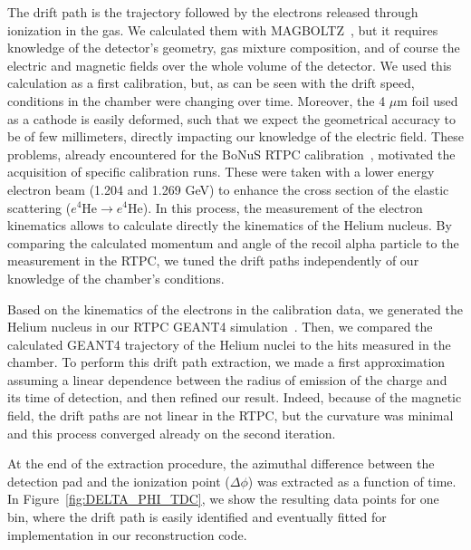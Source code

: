 \documentclass[preprint,5p]{elsarticle}
\begin{document}
The drift path is the trajectory followed by the electrons released through 
ionization in the gas. We calculated them with
MAGBOLTZ~\cite{Biagi:1999nwa}, but it requires knowledge of the detector's 
geometry, gas mixture composition, and of course the electric and magnetic 
fields over the whole volume of the detector. We used this calculation as a 
first calibration, but, 
as can be seen with the drift speed, conditions in the chamber were changing 
over time. Moreover, the 4 $\mu$m foil used as a cathode is easily deformed, such
that we expect the geometrical accuracy to be of few millimeters, directly impacting 
our knowledge of the electric field. These problems, already 
encountered for the BoNuS RTPC calibration~\cite{Fenker:2008zz}, motivated the 
acquisition of specific calibration runs. These were taken with a lower energy 
electron beam (1.204 and 1.269 GeV) to enhance the cross section of the elastic 
scattering ($e^{4}$He$\rightarrow e^{4}$He). In this process, the measurement of
the electron kinematics allows to calculate directly the kinematics of the Helium nucleus. 
By comparing the calculated momentum and angle of the recoil alpha particle to the 
measurement in the RTPC, we tuned the drift paths independently of our 
knowledge of the chamber's conditions.

Based on the kinematics of the electrons in the calibration data, 
we generated the Helium nucleus in our RTPC GEANT4 simulation~\cite{GEANT4}. Then,
we compared the calculated GEANT4 trajectory of the Helium nuclei to 
the hits measured in the chamber. To perform this drift path extraction, 
we made a first approximation assuming a linear dependence between the radius 
of emission of the charge and its time of detection, and then refined our 
result. Indeed, because of the magnetic field, the drift paths are not linear 
in the RTPC, but the curvature was minimal and this process converged already 
on the second iteration. 

At the end of the extraction procedure, the azimuthal difference between the detection pad and 
the ionization point ($\Delta\phi$) was extracted as a function of time.  In 
Figure~\ref{fig:DELTA_PHI_TDC}, we show the resulting data points for one bin, 
where the drift path is easily identified and eventually fitted for 
implementation in our reconstruction code.
\end{document}
